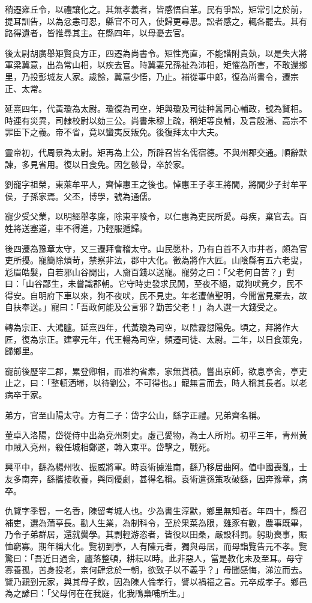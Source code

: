 \begin{pinyinscope}
稍遷雍丘令，以禮讓化之。其無孝義者，皆感悟自革。民有爭訟，矩常引之於前，提耳訓告，以為忿恚可忍，縣官不可入，使歸更尋思。訟者感之，輒各罷去。其有路得遺者，皆推尋其主。在縣四年，以母憂去官。

後太尉胡廣舉矩賢良方正，四遷為尚書令。矩性亮直，不能諧附貴埶，以是失大將軍梁冀意，出為常山相，以疾去官。時冀妻兄孫祉為沛相，矩懼為所害，不敢還鄉里，乃投彭城友人家。歲餘，冀意少悟，乃止。補從事中郎，復為尚書令，遷宗正、太常。

延熹四年，代黃瓊為太尉。瓊復為司空，矩與瓊及司徒种暠同心輔政，號為賢相。時連有災異，司隸校尉以劾三公。尚書朱穆上疏，稱矩等良輔，及言殷湯、高宗不罪臣下之義。帝不省，竟以蠻夷反叛免。後復拜太中大夫。

靈帝初，代周景為太尉。矩再為上公，所辟召皆名儒宿德。不與州郡交通。順辭默諫，多見省用。復以日食免。因乞骸骨，卒於家。

劉寵字祖榮，東萊牟平人，齊悼惠王之後也。悼惠王子孝王將閭，將閭少子封牟平侯，子孫家焉。父丕，博學，號為通儒。

寵少受父業，以明經舉孝廉，除東平陵令，以仁惠為吏民所愛。母疾，棄官去。百姓將送塞道，車不得進，乃輕服遁歸。

後四遷為豫章太守，又三遷拜會稽太守。山民愿朴，乃有白首不入市井者，頗為官吏所擾。寵簡除煩苛，禁察非法，郡中大化。徵為將作大匠。山陰縣有五六老叟，尨眉皓髮，自若邪山谷閒出，人齎百錢以送寵。寵勞之曰：「父老何自苦？」對曰：「山谷鄙生，未嘗識郡朝。它守時吏發求民閒，至夜不絕，或狗吠竟夕，民不得安。自明府下車以來，狗不夜吠，民不見吏。年老遭值聖明，今聞當見棄去，故自扶奉送。」寵曰：「吾政何能及公言邪？勤苦父老！」為人選一大錢受之。

轉為宗正、大鴻臚。延熹四年，代黃瓊為司空，以陰霧愆陽免。頃之，拜將作大匠，復為宗正。建寧元年，代王暢為司空，頻遷司徒、太尉。二年，以日食策免，歸鄉里。

寵前後歷宰二郡，累登卿相，而准約省素，家無貨積。嘗出京師，欲息亭舍，亭吏止之，曰：「整頓洒埽，以待劉公，不可得也。」寵無言而去，時人稱其長者。以老病卒于家。

弟方，官至山陽太守。方有二子：岱字公山，繇字正禮。兄弟齊名稱。

董卓入洛陽，岱從侍中出為兗州刺史。虛己愛物，為士人所附。初平三年，青州黃巾賊入兗州，殺任城相鄭遂，轉入東平。岱擊之，戰死。

興平中，繇為楊州牧、振威將軍。時袁術據淮南，繇乃移居曲阿。值中國喪亂，士友多南奔，繇攜接收養，與同優劇，甚得名稱。袁術遣孫策攻破繇，因奔豫章，病卒。

仇覽字季智，一名香，陳留考城人也。少為書生淳默，鄉里無知者。年四十，縣召補吏，選為蒲亭長。勸人生業，為制科令，至於果菜為限，雞豕有數，農事既畢，乃令子弟群居，還就黌學。其剽輕游恣者，皆役以田桑，嚴設科罰。躬助喪事，賑恤窮寡。期年稱大化。覽初到亭，人有陳元者，獨與母居，而母詣覽告元不孝。覽驚曰：「吾近日過舍，廬落整頓，耕耘以時。此非惡人，當是教化未及至耳。母守寡養孤，苦身投老，柰何肆忿於一朝，欲致子以不義乎？」母聞感悔，涕泣而去。覽乃親到元家，與其母子飲，因為陳人倫孝行，譬以禍福之言。元卒成孝子。鄉邑為之諺曰：「父母何在在我庭，化我鳲梟哺所生。」


\end{pinyinscope}
